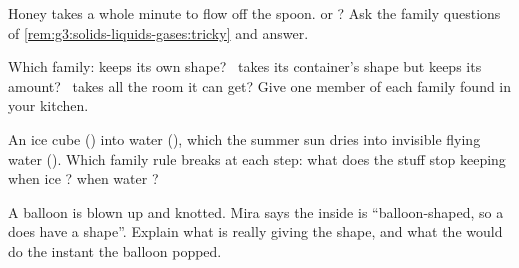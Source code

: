 \begin{exercise}[$\star$]\label{exo:g3:solids-liquids-gases:8}
Honey takes a whole minute to flow off the spoon.  or ?
Ask the family questions of
\cref{rem:g3:solids-liquids-gases:tricky} and answer.
\end{exercise}

\begin{exercise}[$\star$]\label{exo:g3:solids-liquids-gases:9}
Which family: keeps its own shape? \ takes its container's shape but
keeps its amount? \ takes all the room it can get? Give one member
of each family found in your kitchen.
\end{exercise}

\begin{exercise}[$\star\star$]\label{exo:g3:solids-liquids-gases:10}
An ice cube ()  into water (), which the summer sun
dries into invisible flying water (). Which family rule breaks at
each step: what does the stuff stop keeping when ice ? when
water ?
\end{exercise}

\begin{exercise}[$\star\star$]\label{exo:g3:solids-liquids-gases:11}
A balloon is blown up and knotted. Mira says the  inside is
``balloon-shaped, so a  does have a shape''. Explain what is
really giving the shape, and what the  would do the instant the
balloon popped.
\end{exercise}

